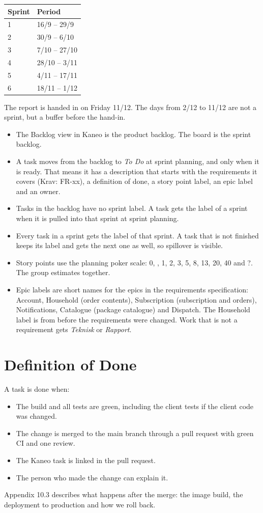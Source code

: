 \documentclass[a4paper,11pt]{article}
\begin{document}
\begin{center}
\begin{tabular}{@{}ll@{}}
Sprint & Period \\ \hline
1 & 16/9 -- 29/9 \\
2 & 30/9 -- 6/10 \\
3 & 7/10 -- 27/10 \\
4 & 28/10 -- 3/11 \\
5 & 4/11 -- 17/11 \\
6 & 18/11 -- 1/12 \\
\end{tabular}
\end{center}

The report is handed in on Friday 11/12. The days from 2/12 to 11/12 are not a sprint, but a buffer before the hand-in.

\begin{itemize}
    \item The Backlog view in Kaneo is the product backlog. The board is the sprint backlog.
    \item A task moves from the backlog to \emph{To Do} at sprint planning, and only when it is ready. That means it has a description that starts with the requirements it covers (Krav: FR-xx), a definition of done, a story point label, an epic label and an owner.
    \item Tasks in the backlog have no sprint label. A task gets the label of a sprint when it is pulled into that sprint at sprint planning.
    \item Every task in a sprint gets the label of that sprint. A task that is not finished keeps its label and gets the next one as well, so spillover is visible.
    \item Story points use the planning poker scale: 0, \textonehalf, 1, 2, 3, 5, 8, 13, 20, 40 and ?. The group estimates together.
    \item Epic labels are short names for the epics in the requirements specification: Account, Household (order contents), Subscription (subscription and orders), Notifications, Catalogue (package catalogue) and Dispatch. The Household label is from before the requirements were changed. Work that is not a requirement gets \emph{Teknisk} or \emph{Rapport}.
\end{itemize}

\section{Definition of Done}
A task is done when:
\begin{itemize}
    \item The build and all tests are green, including the client tests if the client code was changed.
    \item The change is merged to the main branch through a pull request with green CI and one review.
    \item The Kaneo task is linked in the pull request.
    \item The person who made the change can explain it.
\end{itemize}

Appendix 10.3 describes what happens after the merge: the image build, the deployment to production and how we roll back.
\end{document}
